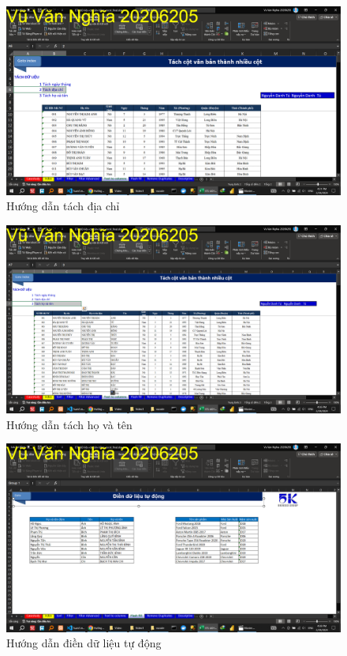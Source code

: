 \documentclass{article}
\begin{document}
\begin{figure}[H]
\centering
\includegraphics[scale = 0.15]{Video1/HuongDan/9.png}
\caption{Hướng dẫn tách địa chỉ}
\end{figure}

\begin{figure}[H]
\centering
\includegraphics[scale = 0.15]{Video1/HuongDan/10.png}
\caption{Hướng dẫn tách họ và tên}
\end{figure}

\begin{figure}[H]
\centering
\includegraphics[scale = 0.15]{Video1/HuongDan/11.png}
\caption{Hướng dẫn điền dữ liệu tự động}
\end{figure}
\end{document}
